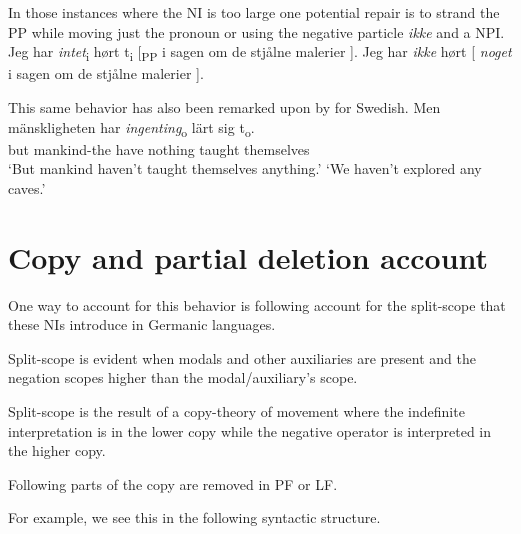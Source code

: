 \documentclass[12pt, letterpaper]{article}
\begin{document}
\ex In those instances where the NI is too large one potential repair is to strand the PP while moving just the pronoun or using the negative particle \textit{ikke} and a NPI.
	\ea Jeg har \textit{intet}\textsubscript{i} hørt t\textsubscript{i} [\textsubscript{PP} i sagen om de stjålne malerier ].
	\ex Jeg har \textit{ikke} hørt [ \textit{noget} i sagen om de stjålne malerier ].
	\z 
 
\ex This same behavior has also been remarked upon by \citet{penkaNegativeIndefinites2011} for Swedish.
	\ea 
	\gll Men mänskligheten har \textit{ingenting}\textsubscript{o} lärt sig t\textsubscript{o}.\\
	but mankind-the have nothing taught themselves\\
	\glt `But mankind haven't taught themselves anything.'
	\glt `We haven't explored any caves.'
	\z 
\z 
\section{Copy and partial deletion account} \label{sec:ZEIJLSTRA}

\ea One way to account for this behavior is following \cite{zeijlstraSyntacticallyComplexStatus2011} account for the split-scope that these NIs introduce in Germanic languages.

\ex Split-scope is evident when modals and other auxiliaries are present and the negation scopes higher than the modal/auxiliary's scope.

\ex Split-scope is the result of a copy-theory of movement where the indefinite interpretation is in the lower copy while the negative operator is interpreted in the higher copy.

\ex Following \citet{fanselowRemarksEconomyPronunciation2001,fanselowDistributedDeletion2002} parts of the copy are removed in PF or LF.

\ex For example, we see this in the following syntactic structure.\\
	
\end{document}
